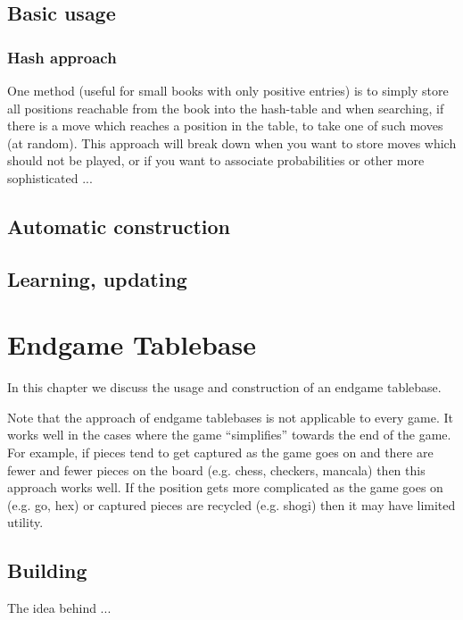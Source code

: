 \documentclass[10pt,dvipdfmx]{report}
\begin{document}
\section{Basic usage}

\subsection{Hash approach}
One method (useful for small books with only positive entries)
is to simply store all positions
reachable from the book into the hash-table and when searching, if there
is a move which reaches a position in the table, to take one of such moves
(at random).  This approach will break down when you want to store moves
which should not be played, or if you want to associate probabilities or
other more sophisticated ...

\section{Automatic construction}

\section{Learning, updating}

\chapter{Endgame Tablebase}
\label{chap-endgame}

In this chapter we discuss the usage and construction of an endgame tablebase.

Note that the approach of endgame tablebases is not applicable to every game.  It works well
in the cases where the game ``simplifies'' towards the end of the game.  For example, if pieces
tend to get captured as the game goes on and there are fewer and fewer pieces on the board
(e.g. chess, checkers, mancala) then this approach works well.  If the position gets more complicated
as the game goes on (e.g. go, hex) or captured pieces are recycled (e.g. shogi)
then it may have limited utility.

\section{Building}
The idea behind ...
\end{document}
